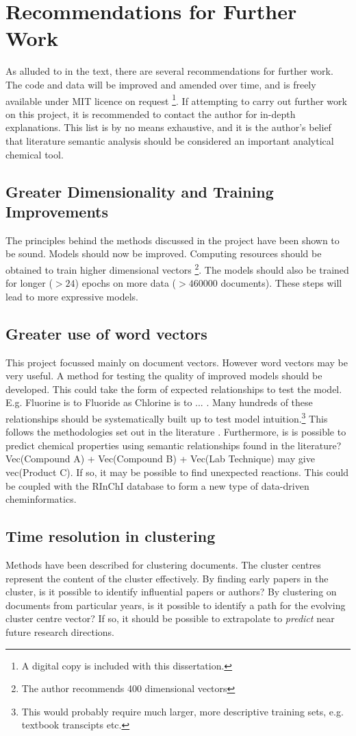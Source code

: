 \chapter{Recommendations for Further Work}
\label{chapt:RECOMMENDATIONS}
As alluded to in the text, there are several recommendations for further work. The code and data will be improved and amended over time, and is freely available under MIT licence on request \footnote{A digital copy is included with this dissertation.}. If attempting to carry out further work on this project, it is recommended to contact the author for in-depth explanations. This list is by no means exhaustive, and it is the author's belief that literature semantic analysis should be considered an important analytical chemical tool.
\section{Greater Dimensionality and Training Improvements}
The principles behind the methods discussed in the project have been shown to be sound. Models should now be improved. Computing resources should be obtained to train higher dimensional vectors \footnote{ The author recommends 400 dimensional vectors}. The models should also be trained for longer ($> 24$) epochs on more data ($> 460000$ documents). These steps will lead to more expressive models.
\section{Greater use of word vectors}
This project focussed mainly on document vectors. However word vectors may be very useful. A method for testing the quality of improved models should be developed. This could take the form of expected relationships to test the model. E.g. Fluorine is to Fluoride as Chlorine is to ... . Many hundreds of these relationships should be systematically built up to test model intuition.\footnote{This would probably require much larger, more descriptive training sets, e.g. textbook transcipts etc.} This follows the methodologies set out in the literature \cite{word2vec1} \cite{word2vec2}. Furthermore, is is possible to predict chemical properties using semantic relationships found in the literature? Vec(Compound A) + Vec(Compound B) + Vec(Lab Technique) may give vec(Product C). If so, it may be possible to find unexpected reactions. This could be coupled with the RInChI database to form a new type of data-driven cheminformatics.
\section{Time resolution in clustering}
Methods have been described for clustering documents. The cluster centres represent the content of the cluster effectively. By finding early papers in the cluster, is it possible to identify influential papers or authors?
By clustering on documents from particular years, is it possible to identify a path for the evolving cluster centre vector? If so, it should be possible to extrapolate to \emph{predict} near future research directions.
